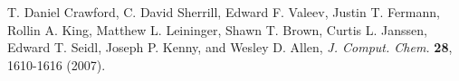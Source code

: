 T. Daniel Crawford, C. David Sherrill, Edward F. Valeev, Justin
T. Fermann, Rollin A. King, Matthew L. Leininger, Shawn T. Brown,
Curtis L. Janssen, Edward T. Seidl, Joseph P. Kenny, and Wesley D. Allen,
{\em J. Comput. Chem.} {\bf 28}, 1610-1616 (2007).
